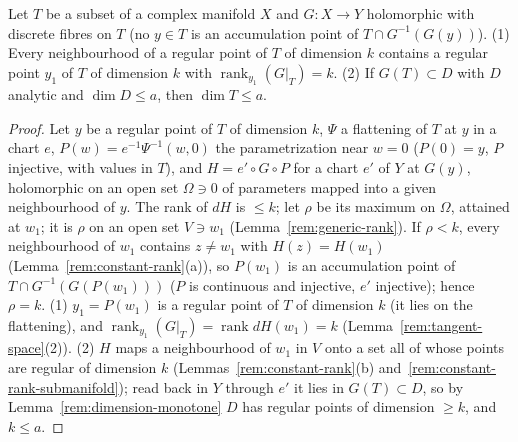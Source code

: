 \begin{lemma}
\label{rem:finite-map-dimension}
\leanok
Let \(T\) be a subset of a complex manifold \(X\) and \(G\colon X\to Y\) holomorphic with discrete fibres on \(T\) (no \(y\in T\) is an accumulation point of
\(T\cap G^{-1}(G(y))\)). (1) Every neighbourhood of a regular point of \(T\) of dimension \(k\) contains a regular point \(y_1\) of \(T\) of dimension \(k\) with
\(\operatorname{rank}_{y_1}(G|_T)=k\). (2) If \(G(T)\subset D\) with \(D\) analytic and \(\dim D\le a\), then \(\dim T\le a\).
\end{lemma}
\begin{proof}
\leanok
Let \(y\) be a regular point of \(T\) of dimension \(k\), \(\Psi\) a flattening of \(T\) at \(y\) in a chart \(e\), \(P(w)=e^{-1}\Psi^{-1}(w,0)\) the parametrization near
\(w=0\) (\(P(0)=y\), \(P\) injective, with values in \(T\)), and \(H=e'\circ G\circ P\) for a chart \(e'\) of \(Y\) at \(G(y)\), holomorphic on an open set \(\Omega\ni0\) of
parameters mapped into a given neighbourhood of \(y\). The rank of \(dH\) is \(\le k\); let \(\rho\) be its maximum on \(\Omega\), attained at \(w_1\); it is \(\rho\)
on an open set \(V\ni w_1\) (Lemma~\ref{rem:generic-rank}). If \(\rho<k\), every neighbourhood of \(w_1\) contains \(z\ne w_1\) with \(H(z)=H(w_1)\)
(Lemma~\ref{rem:constant-rank}(a)), so \(P(w_1)\) is an accumulation point of \(T\cap G^{-1}(G(P(w_1)))\) (\(P\) is continuous and injective, \(e'\) injective);
hence \(\rho=k\). (1) \(y_1=P(w_1)\) is a regular point of \(T\) of dimension \(k\) (it lies on the flattening), and
\(\operatorname{rank}_{y_1}(G|_T)=\operatorname{rank}dH(w_1)=k\) (Lemma~\ref{rem:tangent-space}(2)). (2) \(H\) maps a neighbourhood of \(w_1\) in \(V\) onto a set all of
whose points are regular of dimension \(k\) (Lemmas~\ref{rem:constant-rank}(b) and~\ref{rem:constant-rank-submanifold}); read back in \(Y\) through \(e'\) it
lies in \(G(T)\subset D\), so by Lemma~\ref{rem:dimension-monotone} \(D\) has regular points of dimension \(\ge k\), and \(k\le a\).
\end{proof}

